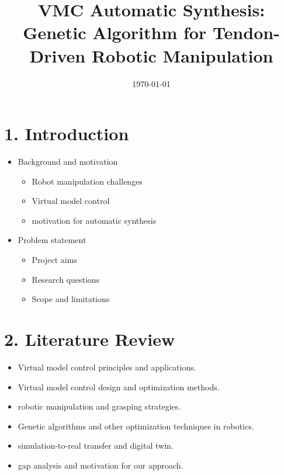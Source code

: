 \documentclass[12pt,a4paper]{article}
\title{VMC Automatic Synthesis: Genetic Algorithm for Tendon-Driven Robotic Manipulation}
\author{}
\date{\today}
\begin{document}
\maketitle


\section*{1. Introduction}
\begin{itemize}
  \item Background and motivation
  \begin{itemize}
    \item Robot manipulation challenges
    \item Virtual model control
    \item motivation for automatic synthesis 
  \end{itemize}
  \item Problem statement
  \begin{itemize}
    \item Project aims
    \item Research questions 
    \item Scope and limitations
  \end{itemize}
\end{itemize}

\section*{2. Literature Review}
\begin{itemize} 

  \item Virtual model control principles and applications.
  \item Virtual model control design and optimization methods.
  \item robotic manipulation and grasping strategies.
  \item Genetic algorithms and other optimization techniques in robotics.
  \item simulation-to-real transfer and digital twin.
  \item gap analysis and motivation for our approach.
\end{itemize}
\end{document}
